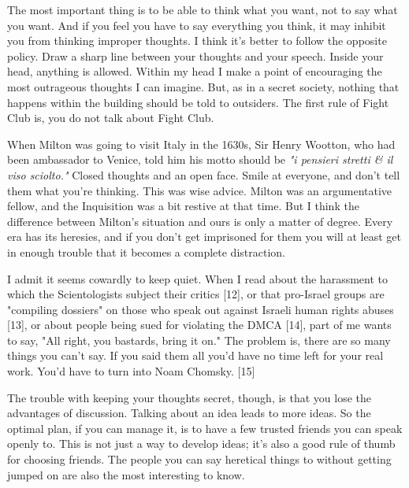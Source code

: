 The
                  most important thing is to be able to think what you want, not
                  to say what you want. And if you feel you have to say
                  everything you think, it may inhibit you from thinking
                  improper thoughts. I think it's better to follow the opposite
                  policy. Draw a sharp line between your thoughts and your
                  speech. Inside your head, anything is allowed. Within my head
                  I make a point of encouraging the most outrageous thoughts I
                  can imagine. But, as in a secret society, nothing that happens
                  within the building should be told to outsiders. The first
                  rule of Fight Club is, you do not talk about Fight Club.

When
                  Milton was going to visit Italy in the 1630s, Sir Henry
                  Wootton, who had been ambassador to Venice, told him his motto
                  should be
                  \emph{"i pensieri stretti \& il viso sciolto."} Closed thoughts
                  and an open face. Smile at everyone, and don't tell them what
                  you're thinking. This was wise advice. Milton was an
                  argumentative fellow, and the Inquisition was a bit restive at
                  that time. But I think the difference between Milton's
                  situation and ours is only a matter of degree. Every era has
                  its heresies, and if you don't get imprisoned for them you
                  will at least get in enough trouble that it becomes a complete
                  distraction.

I admit it seems cowardly to keep
                  quiet. When I read about the harassment to which the
                  Scientologists subject their critics [12], or that pro-Israel
                  groups are "compiling dossiers" on those who speak out against
                  Israeli human rights abuses [13], or about people being sued
                  for violating the DMCA [14], part of me wants to say, "All
                  right, you bastards, bring it on." The problem is, there are
                  so many things you can't say. If you said them all you'd have
                  no time left for your real work. You'd have to turn into Noam
                  Chomsky. [15]

The trouble with keeping your
                  thoughts secret, though, is that you lose the advantages of
                  discussion. Talking about an idea leads to more ideas. So the
                  optimal plan, if you can manage it, is to have a few trusted
                  friends you can speak openly to. This is not just a way to
                  develop ideas; it's also a good rule of thumb for choosing
                  friends. The people you can say heretical things to without
                  getting jumped on are also the most interesting to know.


